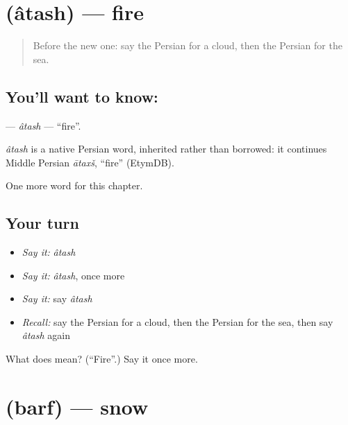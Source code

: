 \section[\texorpdfstring{\fa{آتش} (âtash)}{آتش (âtash)}]{ (âtash) — fire}

\label{lesson:FA-C53-atash}



\begin{quote}
Before the new one: say the Persian for a cloud, then the Persian for the sea.
\end{quote}

\subsection*{You'll want to know: }
\textbf{} — \emph{âtash} — \textquotedblleft{}fire\textquotedblright{}.

\begin{cousinweb}
\emph{âtash} is a native Persian word, inherited rather than borrowed: it continues Middle Persian \emph{ātaxš}, \textquotedblleft{}fire\textquotedblright{} (EtymDB).
\end{cousinweb}

\begin{grammarlens}[title={What you've built}]
One more word for this chapter.
\end{grammarlens}

\subsection*{Your turn}
\begin{itemize}
\raggedright
  \item \emph{Say it:} \emph{âtash}
  \item \emph{Say it:} \emph{âtash}, once more
  \item \emph{Say it:} say \emph{âtash}
  \item \emph{Recall:} say the Persian for a cloud, then the Persian for the sea, then say \emph{âtash} again
\end{itemize}

\begin{tcolorbox}[breakable,colback=teal!4,colframe=teal!35!black,title={Before you move on}]
What does  mean? (\textquotedblleft{}Fire\textquotedblright{}.) Say it once more.
\end{tcolorbox}
\section[\texorpdfstring{\fa{برف} (barf)}{برف (barf)}]{ (barf) — snow}

